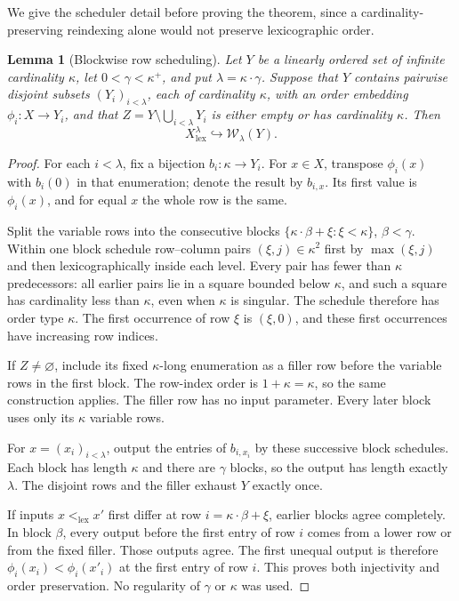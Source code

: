 \documentclass[11pt]{article}
\newtheorem{lemma}[lemma]{Lemma}
\theoremstyle{definition}
\theoremstyle{remark}
\newcommand{\WO}{\mathcal W}
\newcommand{\emb}{\hookrightarrow}
\begin{document}
We give the scheduler detail before proving the theorem, since a
cardinality-preserving reindexing alone would not preserve lexicographic
order.

\begin{lemma}[Blockwise row scheduling]
\label{swo:cb:new:lem:block-scheduler}
Let $Y$ be a linearly ordered set of infinite cardinality $\kappa$, let
$0<\gamma<\kappa^+$, and put $\lambda=\kappa\cdot\gamma$.
Suppose that $Y$ contains pairwise disjoint subsets $(Y_i)_{i<\lambda}$,
each of cardinality $\kappa$, with an order embedding
$\phi_i:X\to Y_i$, and that
$Z=Y\setminus\bigcup_{i<\lambda}Y_i$ is either empty or has
cardinality $\kappa$.  Then
\[
                   X^\lambda_{\mathrm{lex}}\emb\WO_\lambda(Y).
\]
\end{lemma}
\begin{proof}
For each $i<\lambda$, fix a bijection $b_i:\kappa\to Y_i$.
For $x\in X$, transpose $\phi_i(x)$ with $b_i(0)$ in that enumeration;
denote the result by $b_{i,x}$.  Its first value is $\phi_i(x)$,
and for equal $x$ the whole row is the same.

Split the variable rows into the consecutive blocks
$\{\kappa\cdot\beta+\xi:\xi<\kappa\}$, $\beta<\gamma$.
Within one block schedule row--column pairs $(\xi,j)\in\kappa^2$
first by $\max(\xi,j)$ and then lexicographically inside each level.
Every pair has fewer than $\kappa$ predecessors: all earlier pairs lie
in a square bounded below $\kappa$, and such a square has cardinality
less than $\kappa$, even when $\kappa$ is singular.  The schedule
therefore has order type $\kappa$.  The first occurrence of row $\xi$
is $(\xi,0)$, and these first occurrences have increasing row indices.

If $Z\ne\varnothing$, include its fixed $\kappa$-long enumeration as a
filler row before the variable rows in the first block.  The row-index
order is $1+\kappa=\kappa$, so the same construction applies.  The
filler row has no input parameter.  Every later block uses only its
$\kappa$ variable rows.

For $x=(x_i)_{i<\lambda}$, output the entries of $b_{i,x_i}$ by these
successive block schedules.  Each block has length $\kappa$ and there
are $\gamma$ blocks, so the output has length exactly $\lambda$.
The disjoint rows and the filler exhaust $Y$ exactly once.

If inputs $x<_{\mathrm{lex}}x'$ first differ at row
$i=\kappa\cdot\beta+\xi$, earlier blocks agree completely.  In block
$\beta$, every output before the first entry of row $i$ comes from a
lower row or from the fixed filler.  Those outputs agree.  The first
unequal output is therefore $\phi_i(x_i)<\phi_i(x'_i)$ at the first
entry of row $i$.  This proves both injectivity and order preservation.
No regularity of $\gamma$ or $\kappa$ was used.
\end{proof}
\end{document}
